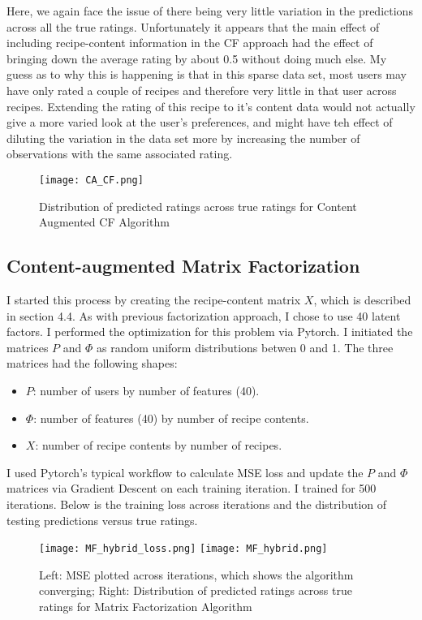 \documentclass{article}
\begin{document}
Here, we again face the issue of there being very little variation in the predictions across all the true ratings. Unfortunately it appears that the main effect of including recipe-content information in the CF approach had the effect of bringing down the average rating by about 0.5 without doing much else. My guess as to why this is happening is that in this sparse data set, most users may have only rated a couple of recipes and therefore very little in that user across recipes. Extending the rating of this recipe to it's content data would not actually give a more varied look at the user's preferences, and might have teh effect of diluting the variation in the data set more by increasing the number of observations with the same associated rating. 
\begin{figure}[H]
    \centering
    \texttt{[image: CA\_CF.png]}
    \caption{Distribution of predicted ratings across true ratings for Content Augmented CF Algorithm}
    \label{fig:ratings_dist}
\end{figure}

\subsection{Content-augmented Matrix Factorization}

I started this process by creating the recipe-content matrix $X$, which is described in section 4.4. As with previous factorization approach, I chose to use 40 latent factors. I performed the optimization for this problem via Pytorch.  I initiated the matrices $P$ and $\Phi$ as random uniform distributions betwen 0 and 1. The three matrices had the following shapes:
\begin{itemize}
    \item $P$: number of users by number of features (40).
    \item  $\Phi$: number of features (40) by number of recipe contents.  
    \item $X$: number of recipe contents by number of recipes. 
\end{itemize}

I used Pytorch's typical workflow to calculate MSE loss and update the $P$ and $\Phi$ matrices via Gradient Descent on each training iteration. I trained for 500 iterations. Below is the training loss across iterations and the distribution of testing predictions versus true ratings. 

\begin{figure}[H]
    \centering
    \texttt{[image: MF\_hybrid\_loss.png]}
    \texttt{[image: MF\_hybrid.png]}
    \caption{Left: MSE plotted across iterations, which shows the algorithm converging; Right: Distribution of predicted ratings across true ratings for Matrix Factorization Algorithm}
    \label{fig:CF}
\end{figure}
\end{document}
